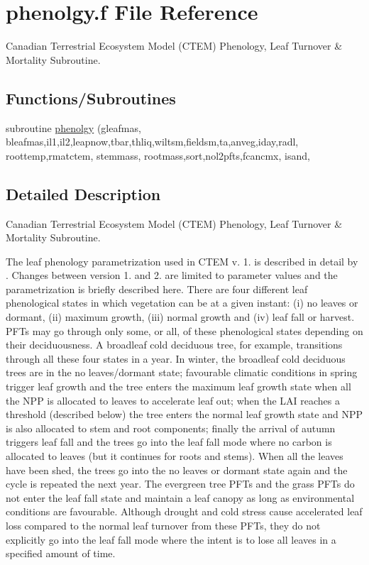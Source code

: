 \hypertarget{phenolgy_8f}{}\section{phenolgy.\+f File Reference}
\label{phenolgy_8f}


Canadian Terrestrial Ecosystem Model (C\+T\+E\+M) Phenology, Leaf Turnover \& Mortality Subroutine.  


\subsection*{Functions/\+Subroutines}
\begin{DoxyCompactItemize}
\item 
subroutine \hyperlink{phenolgy_8f_add1d849abdf1b6baf10cfdde1b93ec0b}{phenolgy} (gleafmas, bleafmas,il1,il2,leapnow,tbar,thliq,wiltsm,fieldsm,ta,anveg,iday,radl, roottemp,rmatctem, stemmass, rootmass,sort,nol2pfts,fcancmx, isand,
\end{DoxyCompactItemize}


\subsection{Detailed Description}
Canadian Terrestrial Ecosystem Model (C\+T\+E\+M) Phenology, Leaf Turnover \& Mortality Subroutine. 

The leaf phenology parametrization used in C\+T\+E\+M v. 1. is described in detail by \cite{Arora2005-6b1}. Changes between version 1. and 2. are limited to parameter values and the parametrization is briefly described here. There are four different leaf phenological states in which vegetation can be at a given instant\+: (i) no leaves or dormant, (ii) maximum growth, (iii) normal growth and (iv) leaf fall or harvest. P\+F\+Ts may go through only some, or all, of these phenological states depending on their deciduousness. A broadleaf cold deciduous tree, for example, transitions through all these four states in a year. In winter, the broadleaf cold deciduous trees are in the no leaves/dormant state; favourable climatic conditions in spring trigger leaf growth and the tree enters the maximum leaf growth state when all the N\+P\+P is allocated to leaves to accelerate leaf out; when the L\+A\+I reaches a threshold (described below) the tree enters the normal leaf growth state and N\+P\+P is also allocated to stem and root components; finally the arrival of autumn triggers leaf fall and the trees go into the leaf fall mode where no carbon is allocated to leaves (but it continues for roots and stems). When all the leaves have been shed, the trees go into the no leaves or dormant state again and the cycle is repeated the next year. The evergreen tree P\+F\+Ts and the grass P\+F\+Ts do not enter the leaf fall state and maintain a leaf canopy as long as environmental conditions are favourable. Although drought and cold stress cause accelerated leaf loss compared to the normal leaf turnover from these P\+F\+Ts, they do not explicitly go into the leaf fall mode where the intent is to lose all leaves in a specified amount of time.

